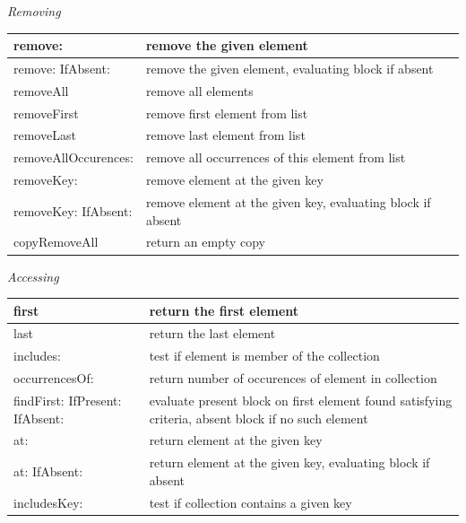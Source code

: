 \documentclass[letterpaper,10pt,english]{sphinxmanual}
\begin{document}
\emph{Removing}

\begin{tabulary}{\linewidth}{p{5cm} p{10cm}}
\hline

remove:
 & 
remove the given element
\\\hline

remove: IfAbsent:
 & 
remove the given element, evaluating block if absent
\\\hline

removeAll
 & 
remove all elements
\\\hline

removeFirst
 & 
remove first element from list
\\\hline

removeLast
 & 
remove last element from list
\\\hline

removeAllOccurences:
 & 
remove all occurrences of this element from list
\\\hline

removeKey:
 & 
remove element at the given key
\\\hline

removeKey: IfAbsent:
 & 
remove element at the given key, evaluating block if absent
\\\hline

copyRemoveAll
 & 
return an empty copy
\\\hline
\end{tabulary}


\emph{Accessing}

\begin{tabulary}{\linewidth}{p{5cm} p{10cm}}
\hline

first
 & 
return the first element
\\\hline

last
 & 
return the last element
\\\hline

includes:
 & 
test if element is member of the collection
\\\hline

occurrencesOf:
 & 
return number of occurences of element in collection
\\\hline

findFirst: IfPresent: IfAbsent:
 & 
evaluate present block on first element found satisfying criteria, absent block if no such element
\\\hline

at:
 & 
return element at the given key
\\\hline

at: IfAbsent:
 & 
return element at the given key, evaluating block if absent
\\\hline

includesKey:
 & 
test if collection contains a given key
\\\hline
\end{tabulary}
\end{document}
